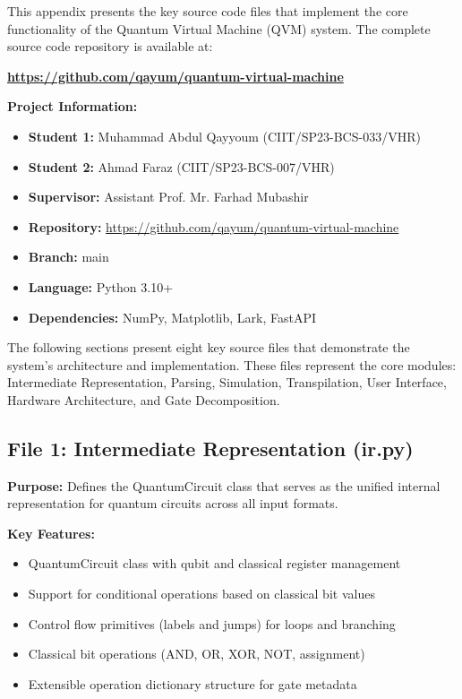 
This appendix presents the key source code files that implement the core functionality of the Quantum Virtual Machine (QVM) system. The complete source code repository is available at:

\begin{center}
\textbf{\url{https://github.com/qayum/quantum-virtual-machine}}
\end{center}

\vspace{0.5cm}

\textbf{Project Information:}
\begin{itemize}
\item \textbf{Student 1:} Muhammad Abdul Qayyoum (CIIT/SP23-BCS-033/VHR)
\item \textbf{Student 2:} Ahmad Faraz (CIIT/SP23-BCS-007/VHR)
\item \textbf{Supervisor:} Assistant Prof. Mr. Farhad Mubashir
\item \textbf{Repository:} \url{https://github.com/qayum/quantum-virtual-machine}
\item \textbf{Branch:} main
\item \textbf{Language:} Python 3.10+
\item \textbf{Dependencies:} NumPy, Matplotlib, Lark, FastAPI
\end{itemize}

\vspace{0.5cm}

The following sections present eight key source files that demonstrate the system's architecture and implementation. These files represent the core modules: Intermediate Representation, Parsing, Simulation, Transpilation, User Interface, Hardware Architecture, and Gate Decomposition.

\clearpage

\subsection{File 1: Intermediate Representation (ir.py)}

\textbf{Purpose:} Defines the QuantumCircuit class that serves as the unified internal representation for quantum circuits across all input formats.

\textbf{Key Features:}
\begin{itemize}
\item QuantumCircuit class with qubit and classical register management
\item Support for conditional operations based on classical bit values
\item Control flow primitives (labels and jumps) for loops and branching
\item Classical bit operations (AND, OR, XOR, NOT, assignment)
\item Extensible operation dictionary structure for gate metadata
\end{itemize}

